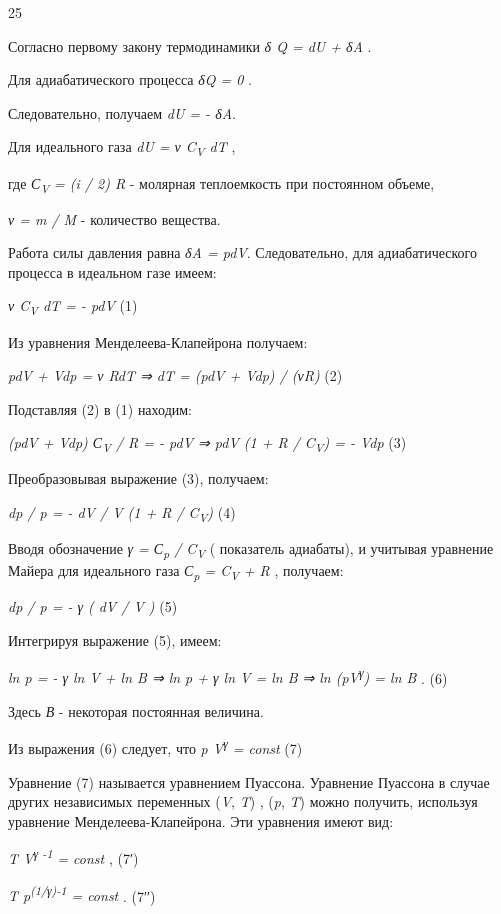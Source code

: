 \solving{}

25

Согласно первому закону термодинамики \emph{δ Q = dU + δA} .

Для адиабатического процесса \emph{δQ = 0} .

Следовательно, получаем \emph{dU = - δA}.

Для идеального газа \emph{dU = ν C\textsubscript{V} dT} ,

где \emph{С\textsubscript{V} = (i / 2) R} - молярная теплоемкость при
постоянном объеме,

\emph{ν = m / M} - количество вещества.

Работа силы давления равна \emph{δA = pdV}. Следовательно, для
адиабатического процесса в идеальном газе имеем:

\emph{ν C\textsubscript{V} dT = - pdV} (1)

Из уравнения Менделеева-Клапейрона получаем:

\emph{pdV + Vdp = ν RdT ⇒ dT = (pdV + Vdp) / (νR)} (2)

Подставляя (2) в (1) находим:

\emph{(pdV + Vdp) С\textsubscript{V} / R = - pdV ⇒ pdV (1 + R /
C\textsubscript{V}) = - Vdp} (3)

Преобразовывая выражение (3), получаем:

\emph{dp / p = - dV / V (1 + R / C\textsubscript{V})} (4)

Вводя обозначение \emph{γ = С\textsubscript{p} / C\textsubscript{V}} (
показатель адиабаты), и учитывая уравнение Майера для идеального газа
\emph{С\textsubscript{p} = C\textsubscript{V} + R} , получаем:

\emph{dp / p = - γ ( dV / V )} (5)

Интегрируя выражение (5), имеем:

\emph{ln p = - γ ln V + ln B ⇒ ln p + γ ln V = ln B ⇒ ln
(pV\textsuperscript{γ}) = ln B} . (6)

Здесь \emph{В} - некоторая постоянная величина.

Из выражения (6) следует, что \emph{p V\textsuperscript{γ} = const} (7)

Уравнение (7) называется уравнением Пуассона. Уравнение Пуассона в
случае других независимых переменных (\emph{V}, \emph{T}) , (\emph{p},
\emph{T}) можно получить, используя уравнение Менделеева-Клапейрона. Эти
уравнения имеют вид:

\emph{T V\textsuperscript{γ -1} = const} , (7′)

\emph{T p\textsuperscript{(1/γ)-1} = const} . (7′′)

